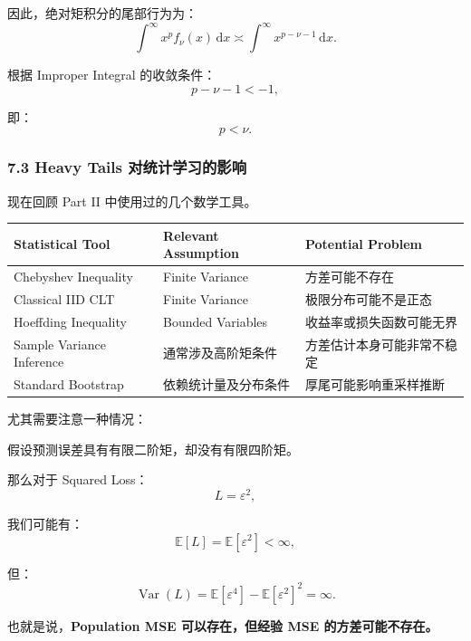 因此，绝对矩积分的尾部行为为：
\[\int^\infty x^pf_\nu(x)\,\mathrm dx
\asymp
\int^\infty x^{p-\nu-1}\,\mathrm dx.\]

根据 Improper Integral 的收敛条件：
\[p-\nu-1<-1,\]

即：
\[\boxed{p<\nu.}\]

\hypertarget{part-4-58-0007-heavy-tails-ux5bf9ux7edfux8ba1ux5b66ux4e60ux7684ux5f71ux54cd}{%
\subsubsection{7.3 Heavy Tails 对统计学习的影响}\label{part-4-58-0007-heavy-tails-ux5bf9ux7edfux8ba1ux5b66ux4e60ux7684ux5f71ux54cd}}

现在回顾 Part II 中使用过的几个数学工具。

\begin{readertable}
\begin{longtable}[]{@{}
  >{\raggedright\arraybackslash}p{}
  >{\raggedright\arraybackslash}p{}
  >{\raggedright\arraybackslash}p{}@{}}
\toprule
Statistical Tool & Relevant Assumption & Potential Problem \\
\midrule
\endhead
Chebyshev Inequality & Finite Variance & 方差可能不存在 \\
Classical IID CLT & Finite Variance & 极限分布可能不是正态 \\
Hoeffding Inequality & Bounded Variables & 收益率或损失函数可能无界 \\
Sample Variance Inference & 通常涉及高阶矩条件 & 方差估计本身可能非常不稳定 \\
Standard Bootstrap & 依赖统计量及分布条件 & 厚尾可能影响重采样推断 \\
\bottomrule
\end{longtable}
\end{readertable}

尤其需要注意一种情况：

假设预测误差具有有限二阶矩，却没有有限四阶矩。

那么对于 Squared Loss：
\[L=\varepsilon^2,\]

我们可能有：
\[\mathbb E[L]=\mathbb E[\varepsilon^2]<\infty,\]

但：
\[\operatorname{Var}(L)
=
\mathbb E[\varepsilon^4]
-\mathbb E[\varepsilon^2]^2
=\infty.\]

也就是说，\textbf{Population MSE 可以存在，但经验 MSE 的方差可能不存在。}

